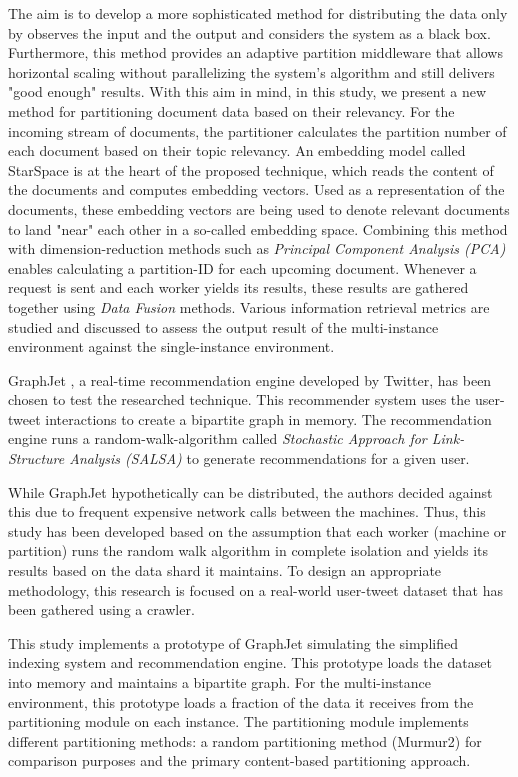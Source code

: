 The aim is to develop a more sophisticated method for distributing the data only by observes the input and the output and considers the system as a black box. Furthermore, this method provides an adaptive partition middleware that allows horizontal scaling without parallelizing the system's algorithm and still delivers "good enough" results. With this aim in mind, in this study, we present a new method for partitioning document data based on their relevancy. For the incoming stream of documents, the partitioner calculates the partition number of each document based on their topic relevancy. An embedding model called StarSpace \cite{wuStarSpaceEmbedAll2017} is at the heart of the proposed technique, which reads the content of the documents and computes embedding vectors. Used as a representation of the documents, these embedding vectors are being used to denote relevant documents to land "near" each other in a so-called embedding space. Combining this method with dimension-reduction methods such as \emph{Principal Component Analysis (PCA)} \cite{woldPrincipalComponentAnalysis1987} enables calculating a partition-ID for each upcoming document. Whenever a request is sent and each worker yields its results, these results are gathered together using \emph{Data Fusion} methods. Various information retrieval metrics are studied and discussed to assess the output result of the multi-instance environment against the single-instance environment.


GraphJet \cite{sharmaGraphJetRealtimeContent2016}, a real-time recommendation engine developed by Twitter, has been chosen to test the researched technique. This recommender system uses the user-tweet interactions to create a bipartite graph in memory. The recommendation engine runs a random-walk-algorithm called \emph{Stochastic Approach for Link-Structure Analysis (SALSA)} \cite{lempelSALSAStochasticApproach2001} to generate recommendations for a given user. 


While GraphJet hypothetically can be distributed, the authors decided against this due to frequent expensive network calls between the machines. Thus, this study has been developed based on the assumption that each worker (machine or partition) runs the random walk algorithm in complete isolation and yields its results based on the data shard it maintains. To design an appropriate methodology, this research is focused on a real-world user-tweet dataset that has been gathered using a crawler. 


This study implements a prototype of GraphJet simulating the simplified indexing system and recommendation engine. This prototype loads the dataset into memory and maintains a bipartite graph. For the multi-instance environment, this prototype loads a fraction of the data it receives from the partitioning module on each instance. The partitioning module implements different partitioning methods: a random partitioning method (Murmur2) for comparison purposes and the primary content-based partitioning approach.


